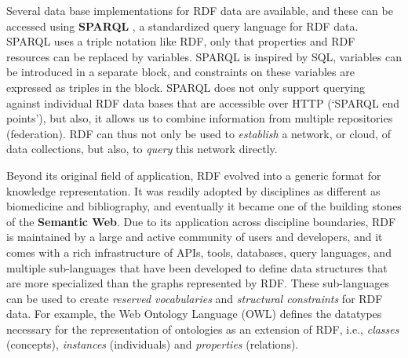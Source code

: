 Several data base implementations for RDF data are available, and these can be accessed using \textbf{SPARQL} \citep{prud2008sparql}, a standardized query language for RDF data.
SPARQL uses a triple notation like RDF, only that properties and RDF resources can be replaced by variables. SPARQL is inspired by SQL, variables can be introduced in a separate  block, and constraints on these variables are expressed as triples in the  block. SPARQL does not only support querying against individual RDF data bases that are accessible over HTTP (`SPARQL end points'), but also, it allows us to combine information from multiple repositories (federation). RDF can thus not only be used to \emph{establish} a network, or cloud, of data collections, but also, to \emph{query} this network directly.

Beyond its original field of application, RDF evolved into a generic format for knowledge representation. It was readily adopted by disciplines as different as biomedicine and bibliography, and eventually it became one of the building stones of the \textbf{Semantic Web}. Due to its application across discipline boundaries, RDF is maintained by a large and active community of users and developers, and it comes with a rich infrastructure of APIs, tools, databases, query languages, and multiple sub-languages that have been developed to define data structures that are more specialized than the graphs represented by RDF. These sub-languages can be used to create \emph{reserved vocabularies} and \emph{structural constraints} for RDF data. For example, the Web Ontology Language (OWL) defines the datatypes necessary for the representation of ontologies as an extension of RDF, i.e., \emph{classes} (concepts), \emph{instances} (individuals) and \emph{properties} (relations). 

